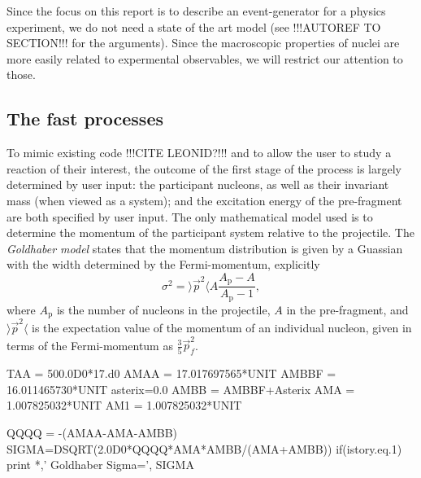 Since the focus on this report is to describe an event-generator for a physics experiment, we do not need a state of the art model (see !!!AUTOREF TO SECTION!!! for the arguments). Since the macroscopic properties of nuclei are more easily related to expermental observables, we will restrict our attention to those. 

\subsection{The fast processes}
To mimic existing code !!!CITE LEONID?!!! and to allow the user to study a reaction of their interest, the outcome of the first stage of the process is largely determined by user input: the participant nucleons, as well as their invariant mass (when viewed as a system); and the excitation energy of the pre-fragment are both specified by user input. The only mathematical model used is to determine the momentum of the participant system relative to the projectile. The \emph{Goldhaber model} states that the momentum distribution is given by a Guassian with the width determined by the Fermi-momentum\cite{goldhaber:1974:art}, explicitly
\begin{equation}
\sigma^2 = \rangle \vec{p}^2 \langle A\frac{A_\text{p}-A}{A_\text{p}-1},
\end{equation}
where $A_\text{p}$ is the number of nucleons in the projectile, $A$ in the pre-fragment, and $\rangle \vec{p}^2 \langle$ is the expectation value of the momentum of an individual nucleon, given in terms of the Fermi-momentum as $\tfrac{3}{5} \vec{p}_f^2$\cite{goldhaber:1974:art}.



          TAA  =  500.0D0*17.d0
          AMAA =  17.017697565*UNIT
          AMBBF = 16.011465730*UNIT
          asterix=0.0    	
          AMBB    = AMBBF+Asterix
          AMA  = 1.007825032*UNIT 
          AM1  = 1.007825032*UNIT

             QQQQ = -(AMAA-AMA-AMBB)
             SIGMA=DSQRT(2.0D0*QQQQ*AMA*AMBB/(AMA+AMBB))   
        if(istory.eq.1) print *,' Goldhaber Sigma=', SIGMA 
